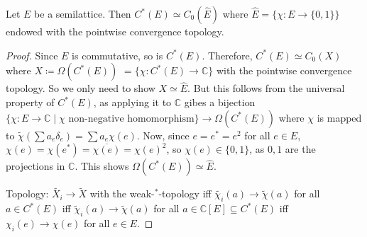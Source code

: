 \documentclass[a4paper]{article}
\begin{document}
\begin{proposition}
	Let $E$ be a semilattice.
	Then $C^*(E) \simeq C_0(\hat{E})$ where $\hat{E} = \{\chi: E \to \{0,1\} \}$ endowed with the pointwise convergence topology.
\end{proposition}

\begin{proof}
	Since $E$ is commutative, so is $C^*(E)$.
	Therefore, $C^*(E) \simeq C_0(X)$ where $X \coloneq \Omega(C^*(E))$ $= \{ \chi: C^*(E) \to \mathds{C} \}$ with the pointwise convergence topology.
	So we only need to show $X \simeq \hat{E}$.
	But this follows from the universal property of $C^*(E)$, as applying it to $\mathds{C}$ gibes a bijection $\{\chi: E \to \mathds{C} \mid \chi \text{ non-negative homomorphism} \} \to \Omega(C^*(E))$ where $\chi$ is mapped to $\tilde{\chi}(\sum a_e \delta_e) = \sum a_e \chi(e)$.
	Now, since $e = e^* = e^2$ for all $e \in E$, $\chi(e) = \chi(e^*) = \overline{\chi(e)} = \chi(e)^2$, so $\chi(e) \in \{0,1\}$, as $0,1$ are the projections in $\mathds{C}$.
	This shows $\Omega(C^*(E)) \simeq \hat{E}$.

	Topology: $\tilde{X_i} \to \tilde{X}$ with the weak-$^*$-topology iff $\tilde{\chi_i}(a) \to \tilde{\chi}(a)$ for all $a \in C^*(E)$ iff $\tilde{\chi}_i(a) \to \tilde{\chi}(a)$ for all $a \in \mathds{C}[E] \subseteq C^*(E)$ iff $\chi_i(e) \to \chi(e)$ for all $e \in E$.
\end{proof}
\end{document}
